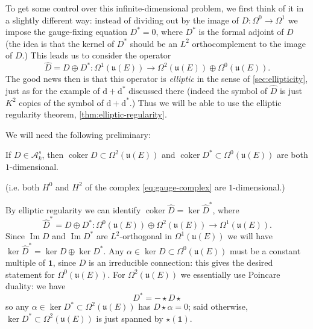 \documentclass[12pt,letterpaper,reqno]{article}
\numberwithin{equation}{section}
\newcommand{\fu}{{\mathfrak u}}
\newcommand{\cA}{\ensuremath{\mathcal A}}
\newcommand\bid{{\mathbf 1}}
\newcommand{\de}{\mathrm{d}}
\newcommand{\ti}[1]{\textit{#1}}
\DeclareMathOperator{\im}{Im}
\DeclareMathOperator{\coker}{coker}
\begin{document}
To get some control over this infinite-dimensional
problem, we first think of it in a slightly different way:
instead of dividing out by the image of $D: \Omega^0 \to \Omega^1$
we impose the gauge-fixing equation $D^* = 0$, where $D^*$ is the
formal adjoint of $D$
(the idea is that the kernel of $D^*$ should be an $L^2$
orthocomplement to the image of $D$.)
This leads us to consider the operator
\begin{equation}
 \hat{D} = D \oplus D^*: \Omega^1(\fu(E)) \to \Omega^2(\fu(E)) \oplus \Omega^0(\fu(E)).
\end{equation}
The good news then is that this operator is \ti{elliptic} in the sense of
\autoref{sec:ellipticity},
just as for the example of $\de + \de^*$ discussed there
(indeed the symbol of $\hat D$ is just $K^2$ copies of the symbol
of $\de + \de^*$.)
Thus we will be able to use the elliptic regularity
theorem, \autoref{thm:elliptic-regularity}.

We will need the following preliminary:
\begin{lem}
\label{lem:cohomology-vanishing-gauge-complex}
If $D \in \cA^s_k$, then
$\coker D \subset \Omega^2(\fu(E))$ and $\coker D^* \subset \Omega^0(\fu(E))$ are both $1$-dimensional.
\end{lem}
(i.e. both $H^0$ and $H^2$ of the complex \eqref{eq:gauge-complex} are
$1$-dimensional.)
\begin{pf}
By elliptic regularity we can identify
$\coker \hat{D} = \ker \hat{D}^*$, where
\begin{equation}
  \hat{D}^* = D \oplus D^*: \Omega^0(\fu(E)) \oplus \Omega^2(\fu(E)) \to \Omega^1(\fu(E)).
\end{equation}
Since $\im D$ and $\im D^*$ are $L^2$-orthogonal in $\Omega^1(\fu(E))$
we will have $\ker \hat{D}^* = \ker D \oplus \ker D^*$.
Any $\alpha \in \ker D \subset \Omega^0(\fu(E))$ must be a constant multiple
of $\bid$, since $D$ is an irreducible connection: this gives
the desired statement for $\Omega^0(\fu(E))$. For $\Omega^2(\fu(E))$ we essentially
use Poincare duality: we have
\begin{equation}
  D^* = - \star D \star
\end{equation}
so any $\alpha \in \ker D^* \subset \Omega^2(\fu(E))$ has $D \star \alpha = 0$; said
otherwise, $\ker D^* \subset \Omega^2(\fu(E))$ is just spanned by $\star (\bid)$.
\end{pf}
\end{document}
